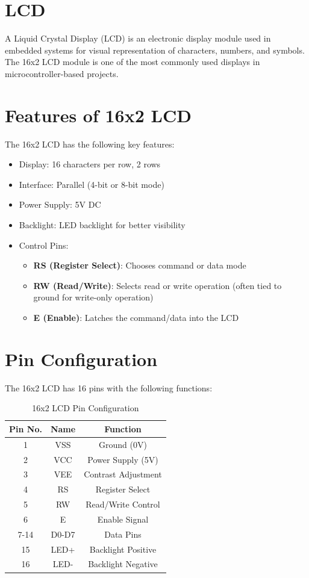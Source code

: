 \documentclass[12pt,a4paper]{article}
\begin{document}
\section{LCD}
A Liquid Crystal Display (LCD) is an electronic display module used in embedded systems for visual representation of characters, numbers, and symbols. The 16x2 LCD module is one of the most commonly used displays in microcontroller-based projects.

\section{Features of 16x2 LCD}
The 16x2 LCD has the following key features:
\begin{itemize}
    \item Display: 16 characters per row, 2 rows
    \item Interface: Parallel (4-bit or 8-bit mode)
    \item Power Supply: 5V DC
    \item Backlight: LED backlight for better visibility
    \item Control Pins:
    \begin{itemize}
        \item \textbf{RS (Register Select)}: Chooses command or data mode
        \item \textbf{RW (Read/Write)}: Selects read or write operation (often tied to ground for write-only operation)
        \item \textbf{E (Enable)}: Latches the command/data into the LCD
    \end{itemize}
\end{itemize}

\section{Pin Configuration}
The 16x2 LCD has 16 pins with the following functions:
\begin{table}[h]
    \centering
    \begin{tabular}{|c|c|c|}
        \hline
        Pin No. & Name & Function \\
        \hline
        1 & VSS & Ground (0V) \\
        2 & VCC & Power Supply (5V) \\
        3 & VEE & Contrast Adjustment \\
        4 & RS & Register Select \\
        5 & RW & Read/Write Control \\
        6 & E  & Enable Signal \\
        7-14 & D0-D7 & Data Pins \\
        15 & LED+ & Backlight Positive \\
        16 & LED- & Backlight Negative \\
       \hline
    \end{tabular}
    \caption{16x2 LCD Pin Configuration}
    \label{tab:lcd_pins}
\end{table}
\end{document}
